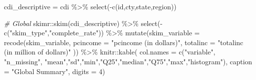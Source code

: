 \documentclass[
]{article}
\newenvironment{Shaded}{\begin{snugshade}}{\end{snugshade}}
\newcommand{\AttributeTok}[1]{\textcolor[rgb]{0.77,0.63,0.00}{#1}}
\newcommand{\CommentTok}[1]{\textcolor[rgb]{0.56,0.35,0.01}{\textit{#1}}}
\newcommand{\DecValTok}[1]{\textcolor[rgb]{0.00,0.00,0.81}{#1}}
\newcommand{\FunctionTok}[1]{\textcolor[rgb]{0.00,0.00,0.00}{#1}}
\newcommand{\NormalTok}[1]{#1}
\newcommand{\OtherTok}[1]{\textcolor[rgb]{0.56,0.35,0.01}{#1}}
\newcommand{\SpecialCharTok}[1]{\textcolor[rgb]{0.00,0.00,0.00}{#1}}
\newcommand{\StringTok}[1]{\textcolor[rgb]{0.31,0.60,0.02}{#1}}
\begin{document}
\begin{Shaded}
\begin{Highlighting}[]
\NormalTok{cdi\_descriptive }\OtherTok{=}\NormalTok{ cdi }\SpecialCharTok{\%\textgreater{}\%} \FunctionTok{select}\NormalTok{(}\SpecialCharTok{{-}}\FunctionTok{c}\NormalTok{(id,cty,state,region))}

\CommentTok{\# Global}
\NormalTok{skimr}\SpecialCharTok{::}\FunctionTok{skim}\NormalTok{(cdi\_descriptive) }\SpecialCharTok{\%\textgreater{}\%} 
  \FunctionTok{select}\NormalTok{(}\SpecialCharTok{{-}}\FunctionTok{c}\NormalTok{(}\StringTok{"skim\_type"}\NormalTok{,}\StringTok{"complete\_rate"}\NormalTok{)) }\SpecialCharTok{\%\textgreater{}\%} 
    \FunctionTok{mutate}\NormalTok{(}\AttributeTok{skim\_variable =} 
             \FunctionTok{recode}\NormalTok{(skim\_variable, }\AttributeTok{pcincome =} \StringTok{"pcincome (in dollars)"}\NormalTok{, }\AttributeTok{totalinc =} \StringTok{"totalinc (in million of dollars)"}
\NormalTok{  )) }\SpecialCharTok{\%\textgreater{}\%} 
\NormalTok{  knitr}\SpecialCharTok{::}\FunctionTok{kable}\NormalTok{(}
    \AttributeTok{col.names =} \FunctionTok{c}\NormalTok{(}\StringTok{"variable"}\NormalTok{, }\StringTok{"n\_missing"}\NormalTok{, }\StringTok{"mean"}\NormalTok{,}\StringTok{"sd"}\NormalTok{,}\StringTok{"min"}\NormalTok{,}\StringTok{"Q25"}\NormalTok{,}\StringTok{"median"}\NormalTok{,}\StringTok{"Q75"}\NormalTok{,}\StringTok{"max"}\NormalTok{,}\StringTok{"histogram"}\NormalTok{),}
    \AttributeTok{caption =} \StringTok{"Global Summary"}\NormalTok{, }\AttributeTok{digits =} \DecValTok{4}\NormalTok{)}
\end{Highlighting}
\end{Shaded}
\end{document}
